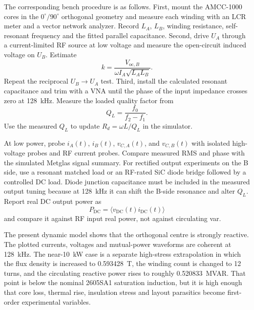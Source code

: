 The corresponding bench procedure is as follows. First, mount the AMCC-1000
cores in the \(0^\circ/90^\circ\) orthogonal geometry and measure each winding
with an LCR meter and a vector network analyzer. Record \(L_A\), \(L_B\),
winding resistance, self-resonant frequency and the fitted parallel
capacitance. Second, drive \(U_A\) through a current-limited RF source at low
voltage and measure the open-circuit induced voltage on \(U_B\). Estimate
\begin{equation}
k = \frac{V_{\mathrm{oc},B}}{\omega I_A\sqrt{L_A L_B}}.
\end{equation}
Repeat the reciprocal \(U_B\rightarrow U_A\) test. Third, install the
calculated resonant capacitance and trim with a VNA until the phase of the
input impedance crosses zero at \SI{128}{\kilo\hertz}. Measure the loaded
quality factor from
\begin{equation}
Q_L=\frac{f_0}{f_2-f_1}.
\end{equation}
Use the measured \(Q_L\) to update \(R_d=\omega L/Q_L\) in the simulator.

At low power, probe \(i_A(t)\), \(i_B(t)\), \(v_{C,A}(t)\), and
\(v_{C,B}(t)\) with isolated high-voltage probes and RF current probes. Compare
measured RMS and phase with the simulated Metglas signal summary. For rectified
output experiments on the B side, use a resonant matched load or an RF-rated
SiC diode bridge followed by a controlled DC load. Diode junction capacitance
must be included in the measured output tuning because at
\SI{128}{\kilo\hertz} it can shift the B-side resonance and alter \(Q_L\).
Report real DC output power as
\begin{equation}
P_{\mathrm{DC}}=\langle v_{\mathrm{DC}}(t)i_{\mathrm{DC}}(t)\rangle
\end{equation}
and compare it against RF input real power, not against circulating var.

The present dynamic model shows that the orthogonal centre is strongly
reactive. The plotted currents, voltages and mutual-power waveforms are
coherent at \SI{128}{\kilo\hertz}. The near-\SI{10}{\kilo\watt} case is a
separate high-stress extrapolation in which the flux density is increased to
\SI{0.593428}{\tesla}, the winding count is changed to 12 turns, and the
circulating reactive power rises to roughly \SI{0.520833}{\mega VAR}. That point
is below the nominal 2605SA1 saturation induction, but it is high enough that
core loss, thermal rise, insulation stress and layout parasitics become
first-order experimental variables.
